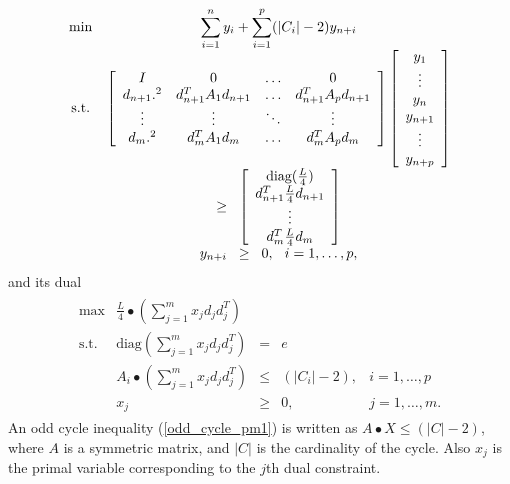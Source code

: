 \documentclass[12pt]{article}
\begin{document}
\begin{eqnarray}
\label{lp_formulation_sdd}
\begin{array}{cc}
\min & \displaystyle \sum_{i=1}^n y_i + \displaystyle \sum_{i=1}^{p} (|C_i|-2)y_{n+i} \\
\mbox{s.t.} & \left[\begin{array}{cccc}
                    I & 0 & \ldots & 0 \\
                    d_{n+1}.^2 & d_{n+1}^TA_1d_{n+1} & \ldots & d_{n+1}^TA_{p}d_{n+1} \\
                    \vdots & \vdots & \ddots & \vdots \\
                    d_{m}.^2 & d_{m}^T A_1d_{m} & \ldots & d_{m}^T A_{p}d_{m}
                    \end{array} \right] \left[\begin{array}{c}
                                              y_1 \\
                                              \vdots \\
                                              y_n \\
                                              y_{n+1} \\
                                              \vdots \\
                                              y_{n+p}
                                              \end{array}\right] \\
& \ge \hspace*{0.2cm}
\left[\begin{array}{c}
      \mbox{diag}(\frac{L}{4}) \\
       d_{n+1}^T \frac{L}{4} d_{n+1} \\
       \vdots \\
       d_{m}^T \frac{L}{4} d_{m}
       \end{array}\right] \\
& y_{n+i} \hspace*{0.2cm} \ge \hspace*{0.2cm}  0, \hspace*{0.25cm}
i=1,\ldots,p,
\end{array}
\end{eqnarray}
and its dual
\begin{eqnarray}
\label{lp_formulation_sdp}
\begin{array}{lrccc}
\max & \frac{L}{4} \bullet (\displaystyle \sum_{j=1}^{m}x_jd_jd_j^T) \\
\mbox{s.t.} & \mbox{diag}(\displaystyle \sum_{j=1}^{m}x_jd_jd_j^T) & = & e \\
& A_i \bullet (\displaystyle \sum_{j=1}^{m}x_jd_jd_j^T) & \le & (|C_i|-2), & i=1,\ldots,p \\
& x_j & \ge & 0, & j=1,\ldots,m.
\end{array}
\end{eqnarray}
An odd cycle inequality (\ref{odd_cycle_pm1}) is written as $ A
\bullet X \le (|C|-2)$, where $A$ is a symmetric matrix, and $|C|$
is the cardinality of the cycle. Also $x_j$ is the primal variable
corresponding to the $j$th dual constraint.
\end{document}
